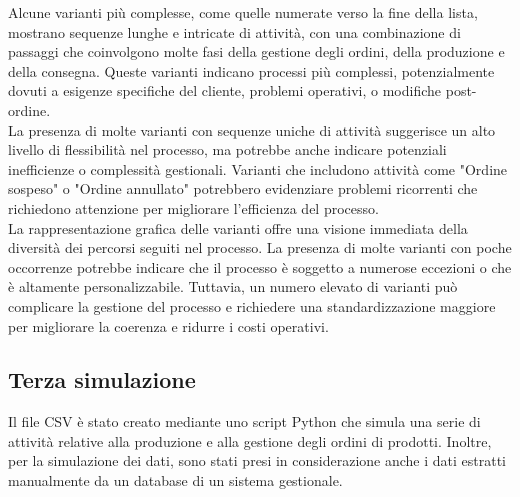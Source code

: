 \documentclass{article}
\begin{document}
Alcune varianti più complesse, come quelle numerate verso la fine della lista, mostrano sequenze lunghe e intricate di attività, con una combinazione di passaggi che coinvolgono molte fasi della gestione degli ordini, della produzione e della consegna. Queste varianti indicano processi più complessi, potenzialmente dovuti a esigenze specifiche del cliente, problemi operativi, o modifiche post-ordine.\\
La presenza di molte varianti con sequenze uniche di attività suggerisce un alto livello di flessibilità nel processo, ma potrebbe anche indicare potenziali inefficienze o complessità gestionali. Varianti che includono attività come "Ordine sospeso" o "Ordine annullato" potrebbero evidenziare problemi ricorrenti che richiedono attenzione per migliorare l'efficienza del processo.\\
La rappresentazione grafica delle varianti offre una visione immediata della diversità dei percorsi seguiti nel processo. La presenza di molte varianti con poche occorrenze potrebbe indicare che il processo è soggetto a numerose eccezioni o che è altamente personalizzabile. Tuttavia, un numero elevato di varianti può complicare la gestione del processo e richiedere una standardizzazione maggiore per migliorare la coerenza e ridurre i costi operativi.\\

\subsection{Terza simulazione}
Il file CSV è stato creato mediante uno script Python che simula una serie di attività relative alla produzione e alla gestione degli ordini di prodotti. Inoltre, per la simulazione dei dati, sono stati presi in considerazione anche i dati estratti manualmente da un database di un sistema gestionale.
\end{document}
